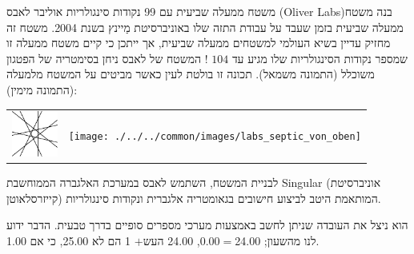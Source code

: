 \begin{surferPage}{משטח ממעלה שביעית עם 99 נקודות סינגולריות}
    אוליבר לאבס
    \textenglish{ (Oliver Labs)}בנה משטח ממעלה שביעית בזמן שעבד על
    עבודת התזה שלו באוניברסיטת מַיינץ בשנת 2004. משטח זה מחזיק עדיין בשיא העולמי למשטחים ממעלה שביעית,
    אך ייתכן כי קיים משטח ממעלה זו שמספר נקודות הסינגולריות שלו מגיע עד $104$
    !  
    המשטח של לאבס ניחן בסימטריה של הפטגון משוכלל (התמונה משמאל).
    תכונה זו בולטת לעין כאשר מביטים על המשטח מלמעלה (התמונה מימין):

    \vspace*{-0.3em}
    \begin{center}
      \begin{tabular}{c@{\qquad}c}
        \includegraphics[height=1.5cm]{./../../common/images/labsseptic1.pdf}
        &
        \texttt{[image: ./../../common/images/labs\_septic\_von\_oben]}
      \end{tabular}
    \end{center}
    \vspace*{-0.3em}

    לבניית המשטח, השתמש לאבס במערכת האלגברה הממוחשבת
    {\sc Singular} (אוניברסיטת קייזרסלאוטן) המותאמת היטב
    לביצוע חישובים בגאומטריה אלגברית ונקודות סינגולריות.

    הוא ניצל את העובדה שניתן לחשב באמצעות מערכי מספרים סופיים
    בדרך טבעית. הדבר ידוע לנו מהשעון; 24.00$=$0.00, 24.00 $+ שעה $ 1 הם
    לא 25.00, כי אם 1.00.
\end{surferPage}
